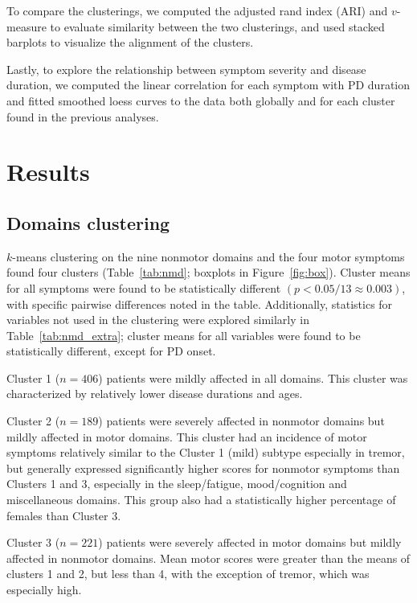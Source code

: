 \documentclass[preprint,5p]{elsarticle} %
\begin{document}
To compare the clusterings, we computed the adjusted rand index\cite{hubert1985} (ARI) and
$v$-measure\cite{rosenberg07vmeasure} to evaluate similarity between the two clusterings, and used
stacked barplots to visualize the alignment of the clusters.

Lastly, to explore the relationship between symptom severity and disease duration, we computed the
linear correlation for each symptom with PD duration and fitted smoothed loess curves to the
data both globally and for each cluster found in the previous analyses.

\section{Results}

\subsection{Domains clustering}

$k$-means clustering on the nine nonmotor domains and the four motor symptoms found four clusters
(Table~\ref{tab:nmd}; boxplots in Figure~\ref{fig:box}). Cluster means for all
symptoms were found to be statistically different $(p < 0.05 / 13 \approx 0.003)$, with specific
pairwise differences noted in the table. Additionally, statistics for variables not used in the
clustering were explored similarly in Table~\ref{tab:nmd_extra}; cluster means for all variables
were found to be statistically different, except for PD onset.

Cluster 1 ($n = 406$) patients were mildly affected in all domains. This cluster was characterized
by relatively lower disease durations and ages.

Cluster 2 ($n = 189$) patients were severely affected in nonmotor domains but mildly affected in
motor domains. This cluster had an incidence of motor symptoms relatively similar to the Cluster 1
(mild) subtype especially in tremor, but generally expressed significantly higher scores for
nonmotor symptoms than Clusters 1 and 3, especially in the sleep/fatigue, mood/cognition and
miscellaneous domains. This group also had a statistically higher percentage of females than
Cluster 3.

Cluster 3 ($n = 221$) patients were severely affected in motor domains but mildly affected in
nonmotor domains. Mean motor scores were greater than the means of clusters 1 and 2, but less than
4, with the exception of tremor, which was especially high.
\end{document}
